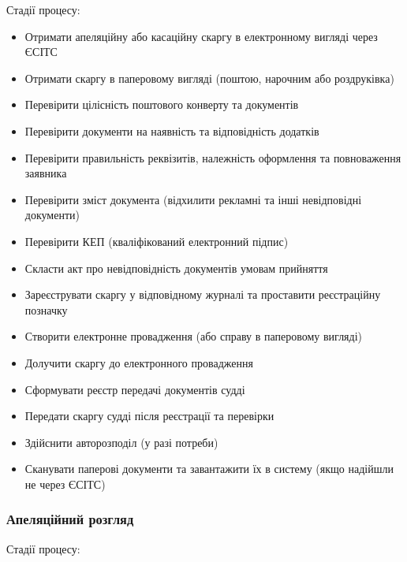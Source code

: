 \documentclass{article}
\begin{document}
Стадії процесу:

\begin{itemize}
    \item Отримати апеляційну або касаційну скаргу в електронному вигляді через ЄСІТС
    \item Отримати скаргу в паперовому вигляді (поштою, нарочним або роздруківка)
    \item Перевірити цілісність поштового конверту та документів
    \item Перевірити документи на наявність та відповідність додатків
    \item Перевірити правильність реквізитів, належність оформлення та повноваження заявника
    \item Перевірити зміст документа (відхилити рекламні та інші невідповідні документи)
    \item Перевірити КЕП (кваліфікований електронний підпис)
    \item Скласти акт про невідповідність документів умовам прийняття
    \item Зареєструвати скаргу у відповідному журналі та проставити реєстраційну позначку
    \item Створити електронне провадження (або справу в паперовому вигляді)
    \item Долучити скаргу до електронного провадження
    \item Сформувати реєстр передачі документів судді
    \item Передати скаргу судді після реєстрації та перевірки
    \item Здійснити авторозподіл (у разі потреби)
    \item Сканувати паперові документи та завантажити їх в систему (якщо надійшли не через ЄСІТС)
\end{itemize}

\newpage
\subsubsection{Апеляційний розгляд}

Стадії процесу:
\end{document}
